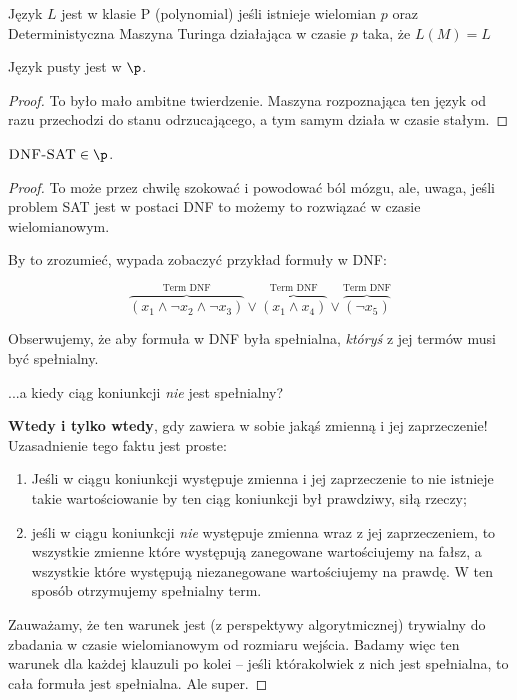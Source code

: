 \begin{definition}
	Język \( L \) jest w klasie P (polynomial) jeśli istnieje wielomian \( p \)
	oraz Deterministyczna Maszyna Turinga działająca w czasie \( p \) taka, że \( L(M) = L \)
\end{definition}

\begin{theorem}
	Język pusty jest w \(\p\).
\end{theorem}
\begin{proof}
	To było mało ambitne twierdzenie. Maszyna rozpoznająca ten język od razu przechodzi do stanu odrzucającego, a tym samym działa w czasie stałym.
\end{proof}

\begin{theorem}
	\( \textsc{DNF-SAT} \in \p \).
\end{theorem}
\begin{proof}
	To może przez chwilę szokować i powodować ból mózgu, ale, uwaga, jeśli problem \textsc{SAT} jest w postaci \textsc{DNF} to możemy to rozwiązać w czasie wielomianowym.

	By to zrozumieć, wypada zobaczyć przykład formuły w \textsc{DNF}:

	\[
		\overbrace{(x_1 \land \neg x_2 \land \neg x_3)}^{\text{Term DNF}} \lor \overbrace{(x_1 \land x_4)}^{\text{Term DNF}} \lor \overbrace{(\neg x_5)}^{\text{Term DNF}}
	\]

	Obserwujemy, że aby formuła w \textsc{DNF} była spełnialna, \textit{któryś} z jej termów musi być spełnialny.

	...a kiedy ciąg koniunkcji \textit{nie} jest spełnialny?

	\textbf{Wtedy i tylko wtedy}, gdy zawiera w sobie jakąś zmienną i jej zaprzeczenie! Uzasadnienie tego faktu jest proste:

	\begin{enumerate}
		\item Jeśli w ciągu koniunkcji występuje zmienna i jej zaprzeczenie to nie istnieje takie wartościowanie by ten ciąg koniunkcji był prawdziwy, siłą rzeczy;
		\item jeśli w ciągu koniunkcji \textit{nie} występuje zmienna wraz z jej zaprzeczeniem, to wszystkie zmienne które występują zanegowane wartościujemy na fałsz, a wszystkie które występują niezanegowane wartościujemy na prawdę. W ten sposób otrzymujemy spełnialny term.
	\end{enumerate}

	Zauważamy, że ten warunek jest (z perspektywy algorytmicznej) trywialny do zbadania w czasie wielomianowym od rozmiaru wejścia. Badamy więc ten warunek dla każdej klauzuli po kolei -- jeśli którakolwiek z nich jest spełnialna, to cała formuła jest spełnialna. Ale super.

\end{proof}

